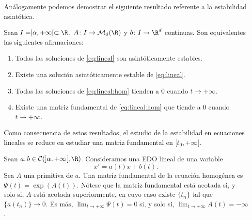   Análogamente podemos demostrar el siguiente resultado referente a la estabilidad asintótica.
  \begin{proposition}
    Sean $I = ]\alpha, +\infty[ \subset \R$, $A \colon I \to \mathcal{M}_{d}(\R)$ y
    $b \colon I \to \R^d$ continuas. Son equivalentes las siguientes afirmaciones:
    \begin{enumerate}
    \item Todas las soluciones de \eqref{eq:lineal} son asintóticamente estables.
    \item Existe una solución asintóticamente estable de \eqref{eq:lineal}.
    \item Todas las soluciones de \eqref{eq:lineal:hom} tienden a $0$ cuando $t \to +\infty$.
    \item Existe una matriz fundamental de \eqref{eq:lineal:hom} que tiende a $0$ cuando
      $t \to +\infty$.
    \end{enumerate}
  \end{proposition}

  Como consecuencia de estos resultados, el estudio de la estabilidad en ecuaciones lineales se
  reduce en estudiar una matriz fundamental en $[t_0, +\infty[$.

\begin{ex}
  Sean $a, b \in \mathcal{C}(]\alpha, +\infty[, \R)$. Consideramos una EDO lineal de una variable
  \begin{equation}
    \label{eq:lineal:1}
    x' = a(t)x+b(t).
  \end{equation}
  Sea $A$ una primitiva de $a$. Una matriz fundamental de la ecuación homogénea es
  $\Psi(t) = \exp(A(t))$. Nótese que la matriz fundamental está acotada si, y solo si, $A$ está
  acotada superiormente, en cuyo caso existe $\{t_n\}$ tal que $\{a(t_n)\} \to 0$. Es más,
  $\lim_{t \to +\infty} \Psi(t) = 0$ si, y solo si, $\lim_{t \to +\infty} A(t) = -\infty$.
\end{ex}

